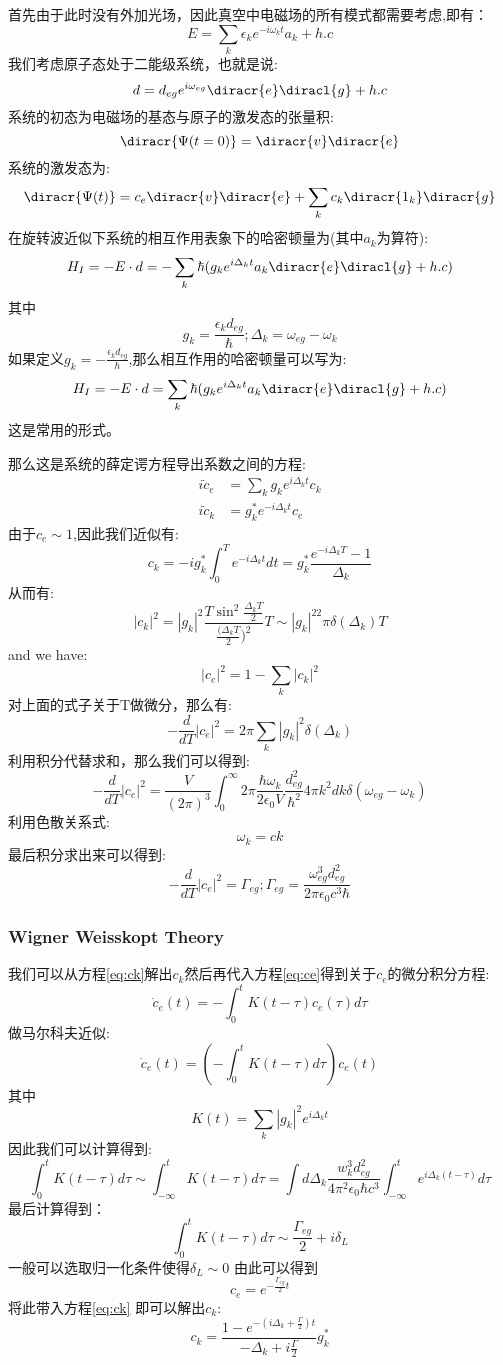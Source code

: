 首先由于此时没有外加光场，因此真空中电磁场的所有模式都需要考虑,即有：
\[E=\sum_k\epsilon_ke^{-i\omega_kt}a_k+h.c\]
我们考虑原子态处于二能级系统，也就是说:
\[d=d_{eg}e^{i\omega_{eg}}\diracr{e}\diracl{g}+h.c\]
系统的初态为电磁场的基态与原子的激发态的张量积:
\[\diracr{\Psi(t=0)}=\diracr{v}\diracr{e}\]
系统的激发态为:
\[\diracr{\Psi(t)}=c_e\diracr{v}\diracr{e}+\sum_kc_k\diracr{1_k}\diracr{g}\]
在旋转波近似下系统的相互作用表象下的哈密顿量为(其中$a_k$为算符):
\[H_I=-E\cdot d=-\sum_k\hbar(g_ke^{i\Delta_k t}a_k\diracr{e}\diracl{g}+h.c)\]
其中
\[g_k=\frac{\epsilon_k d_{eg}}{\hbar};\Delta_k=\omega_{eg}-\omega_k\]
如果定义$g_k=-\frac{\epsilon_k d_{eg}}{\hbar}$,那么相互作用的哈密顿量可以写为:
\[H_I=-E\cdot d=\sum_k\hbar(g_ke^{i\Delta_k t}a_k\diracr{e}\diracl{g}+h.c)\]
这是常用的形式。\par
那么这是系统的薛定谔方程导出系数之间的方程:
\begin{align}
i\dot{c}_e&=\sum_kg_ke^{i\Delta_kt}c_k\label{eq:ce}\\
i\dot{c}_k&=g^*_ke^{-i\Delta_kt}c_e\label{eq:ck}
\end{align}
由于$c_e\sim 1$,因此我们近似有:
\[c_k=-ig^*_k\int_0^Te^{-i\Delta_kt}dt=g^*_k\frac{e^{-i\Delta_kT}-1}{\Delta_k} \]
从而有:
\[|c_k|^2=|g_k|^2\frac{T\sin^2\frac{\Delta_kT}{2}}{\frac{(\Delta_kT}{2})^2}T\sim |g_k|^22\pi\delta(\Delta_k)T \]
and we have:
\[|c_e|^2=1-\sum_k|c_k|^2\]
对上面的式子关于T做微分，那么有:
\[-\frac{d}{dT}|c_e|^2=2\pi\sum_k|g_k|^2\delta(\Delta_k)\]
利用积分代替求和，那么我们可以得到:
\[-\frac{d}{dT}|c_e|^2=\frac{V}{(2\pi)^3} \int_0^\infty 2\pi \frac{\hbar\omega_k}{2\epsilon_0 V}\frac{d_{eg}^2}{\hbar^2} 4\pi k^2 dk \delta(\omega_{eg}-\omega_k)\]
利用色散关系式:
\[\omega_k=ck\]
最后积分求出来可以得到:
\[-\frac{d}{dT}|c_e|^2=\Gamma_{eg};\Gamma_{eg}=\frac{\omega_{eg}^3d_{eg}^2}{2\pi\epsilon_0c^3\hbar}\]
\subsubsection{Wigner Weisskopt Theory}
我们可以从方程\ref{eq:ck}解出$c_k$然后再代入方程\ref{eq:ce}得到关于$c_e$的微分积分方程:
\[\dot{c}_e(t)=-\int_0^tK(t-\tau)c_e(\tau)d\tau\]
做马尔科夫近似:
\[\dot{c}_e(t)=(-\int_0^tK(t-\tau)d\tau)c_e(t)\]
其中
\[K(t)=\sum_k|g_k|^2e^{i\Delta_kt}\]
因此我们可以计算得到:
\[\int_0^tK(t-\tau)d\tau\sim \int_{-\infty}^tK(t-\tau)d\tau=\int d\Delta_k\frac{w_k^3d_{eg}^2}{4\pi^2\epsilon_0\hbar c^3}\int_{-\infty}^te^{i\Delta_k(t-\tau)}d\tau\]
最后计算得到：
\[\int_0^tK(t-\tau)d\tau\sim \frac{\Gamma_{eg}}{2}+i\delta_L\]
一般可以选取归一化条件使得$\delta_L\sim 0$
由此可以得到
\[c_e=e^{-\frac{\Gamma_{eg}}{2}t}\]
将此带入方程\ref{eq:ck} 即可以解出$c_k$:
\[c_k=\frac{1-e^{-(i\Delta_k+\frac{\Gamma}{2})t}}{-\Delta_k+i\frac{\Gamma}{2}}g^*_k\]
